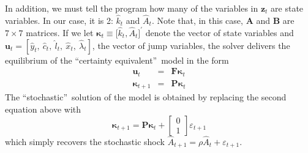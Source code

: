 \documentclass[12pt]{article}
\begin{document}
In addition, we must tell the program how many of the variables in $\mathbf{z%
}_{t}$ are state variables. In our case, it is 2: $\hat{k}_{t}$ and $\hat{A}%
_{t}$. Note that, in this case, $\mathbf{A}$ and $\mathbf{B}$ are $7\times 7$
matrices. If we let $\mathbf{\kappa }_{t}\equiv \lbrack \hat{k}_{t},\hat{A}%
_{t}]^{\prime }$ denote the vector of state variables and $\mathbf{u}_{t}=[%
\hat{y}_{t},\ \hat{c}_{t},\ \hat{l}_{t},\ \hat{x}_{t},\ \hat{\lambda}_{t}]$,
the vector of jump variables, the solver delivers the equilibrium of the
\textquotedblleft certainty equivalent\textquotedblright\ model in the form%
\begin{eqnarray*}
\mathbf{u}_{t} &=&\mathbf{F\kappa }_{t} \\
\mathbf{\kappa }_{t+1} &=&\mathbf{P\kappa }_{t}
\end{eqnarray*}%
The \textquotedblleft stochastic\textquotedblright\ solution of the model is
obtained by replacing the second equation above with%
\begin{equation*}
\mathbf{\kappa }_{t+1}=\mathbf{P\kappa }_{t}+\left[ 
\begin{array}{c}
0 \\ 
1%
\end{array}%
\right] \varepsilon _{t+1}
\end{equation*}%
which simply recovers the stochastic shock $\hat{A}_{t+1}=\rho \hat{A}%
_{t}+\varepsilon _{t+1}$.
\end{document}
